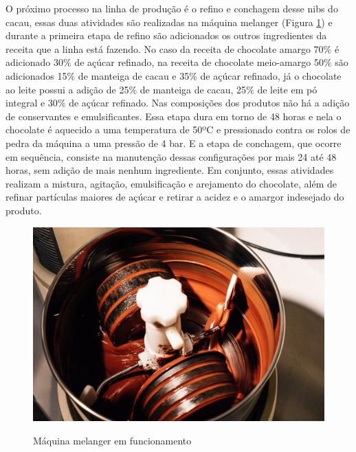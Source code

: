 \documentclass[
	12pt,				%
	openright,			%
	oneside,			%
	a4paper,			%
	english,			%
	french,				%
	spanish,			%
	brazil				%
	]{abntex2}
\begin{document}
O próximo processo na linha de produção é o refino e conchagem desse nibs do cacau, essas duas atividades são realizadas na máquina melanger (Figura \ref{figmelanger}) e durante a primeira etapa de refino são adicionados os outros ingredientes da receita que a linha está fazendo. No caso da receita de chocolate amargo 70$\%$ é adicionado 30$\%$ de açúcar refinado, na receita de chocolate meio-amargo 50$\%$ são adicionados 15$\%$ de manteiga de cacau e 35$\%$ de açúcar refinado, já o chocolate ao leite possui a adição de 25$\%$ de manteiga de cacau, 25$\%$ de leite em pó integral e 30$\%$ de açúcar refinado. Nas composições dos produtos não há a adição de conservantes e emulsificantes. Essa etapa dura em torno de 48 horas e nela o chocolate é aquecido a uma temperatura de 50ºC e pressionado contra os rolos de pedra da máquina a uma pressão de 4 bar. E a etapa de conchagem, que ocorre em sequência, consiste na manutenção dessas configurações por mais 24 até 48 horas, sem adição de mais nenhum ingrediente. Em conjunto, essas atividades realizam a mistura, agitação, emulsificação e arejamento do chocolate, além de refinar partículas maiores de açúcar e retirar a acidez e o amargor indesejado do produto. \cite{lindt} 

\begin{figure}[H]
\begin{center}
\caption{Máquina melanger em funcionamento}
\includegraphics[scale=0.35]{../../Pictures/melanger.jpeg} 
\label{figmelanger}
\end{center}
\end{figure}
\end{document}
